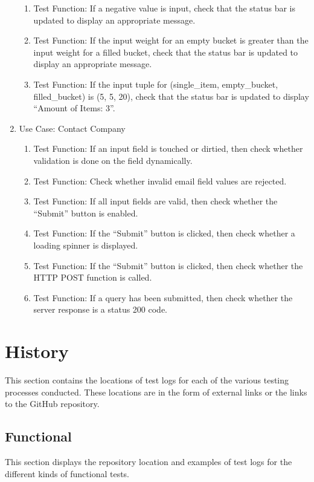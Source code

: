 \documentclass[a4paper, 11pt]{article}
\begin{document}
\begin{enumerate}
\begin{enumerate}
                    \item Test Function: If a negative value is input, check that the status bar is updated to display an appropriate message.
                    \item Test Function: If the input weight for an empty bucket is greater than the input weight for a filled bucket, check that the status bar is updated to display an appropriate message.
                    \item Test Function: If the input tuple for (single\_item, empty\_bucket, filled\_bucket) is (5, 5, 20), check that the status bar is updated to display “Amount of Items: 3”.
                \end{enumerate}
            \item Use Case: Contact Company
                \begin{enumerate}
                    \item Test Function: If an input field is touched or dirtied, then check whether validation is done on the field dynamically.
                    \item Test Function: Check whether invalid email field values are rejected.
                    \item Test Function: If all input fields are valid, then check whether the “Submit” button is enabled.
                    \item Test Function: If the “Submit” button is clicked, then check whether a loading spinner is displayed.
                    \item Test Function: If the “Submit” button is clicked, then check whether the HTTP POST function is called.
                    \item Test Function: If a query has been submitted, then check whether the server response is a status 200 code.
                \end{enumerate}
        \end{enumerate}

\section{History}
This section contains the locations of test logs for each of the various testing processes conducted. These locations are in the form of external links or the links to the GitHub repository.

    \subsection{Functional}
    This section displays the repository location and examples of test logs for the different kinds of functional tests.
\end{document}

